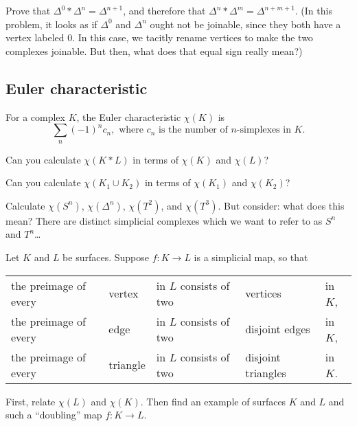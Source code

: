 \documentclass[12pt]{pset}
\newcommand{\join}{\ast}
\begin{document}
\begin{problem}
  Prove that $\Delta^0 \join \Delta^n = \Delta^{n+1}$, and therefore
  that $\Delta^n \join \Delta^m = \Delta^{n+m+1}$.  (In this problem,
  it looks as if $\Delta^0$ and $\Delta^n$ ought not be joinable,
  since they both have a vertex labeled $0$.  In this case, we
  tacitly rename vertices to make the two complexes joinable.  But
  then, what does that equal sign really mean?)
\end{problem}

\pagebreak

\subsection*{Euler characteristic}

\begin{definition*}
For a complex $K$, the Euler characteristic $\chi(K)$ is
$$
\sum_{n} (-1)^n c_n, \mbox{ where $c_n$ is the number of $n$-simplexes
  in $K$.}
$$
\end{definition*}

\begin{requiredproblem}
Can you calculate $\chi(K \join L)$ in terms of $\chi(K)$ and $\chi(L)$?
\end{requiredproblem}

\begin{requiredproblem}
Can you calculate $\chi(K_1 \cup K_2)$ in terms of $\chi(K_1)$ and
$\chi(K_2)$?%
\end{requiredproblem}

\begin{requiredproblem}
  Calculate $\chi(S^n)$, $\chi(\Delta^n)$, $\chi(T^2)$, and
  $\chi(T^3)$.  But consider: what does this mean?  There are distinct
  simplicial complexes which we want to refer to as $S^n$ and
  $T^n$\ldots
\end{requiredproblem}

\begin{problem}
  Let $K$ and $L$ be surfaces.  Suppose $f : K \to L$ is a simplicial
  map, so that
\begin{center}
\begin{tabular}{l@{ }l@{ }l@{ }l@{ }l}
the preimage of every & vertex & in $L$ consists of two & vertices & in $K$, \\
the preimage of every & edge & in $L$ consists of two & disjoint edges & in $K$, \\
the preimage of every & triangle & in $L$ consists of two & disjoint triangles & in $K$.
\end{tabular}
\end{center}
First, relate $\chi(L)$ and $\chi(K)$.  Then find an example of surfaces $K$
and $L$ and such a ``doubling'' map $f : K \to L$.
\end{problem}
\end{document}
